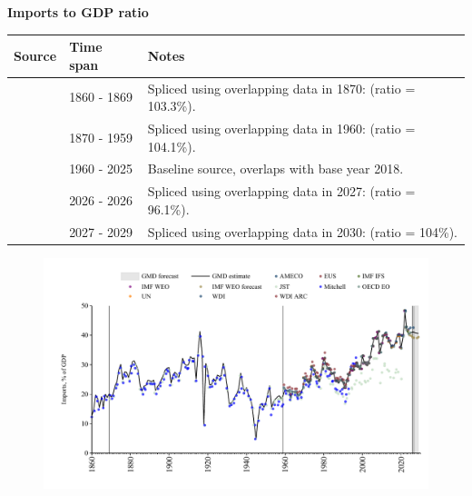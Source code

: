 \documentclass[12pt,a4paper,landscape]{article}
\begin{document}
\begin{adjustbox}{max totalsize={\paperwidth}{\paperheight},center}
\begin{minipage}[t][\textheight][t]{\textwidth}
\vspace*{0.5cm}
{}
\begin{center}
{\Large\bfseries Imports to GDP ratio}
\end{center}
\vspace{0.5cm}
\begin{table}[H]
\centering
\small
\begin{tabular}{|l|l|l|}
\hline
\textbf{Source} & \textbf{Time span} & \textbf{Notes} \\
\hline
\rowcolor{white}\cite{Mitchell}& 1860 - 1869 &Spliced using overlapping data in 1870: (ratio = 103.3\%). \\
\rowcolor{lightgray}\cite{JST}& 1870 - 1959 &Spliced using overlapping data in 1960: (ratio = 104.1\%). \\
\rowcolor{white}\cite{OECD_EO}& 1960 - 2025 &Baseline source, overlaps with base year 2018. \\
\rowcolor{lightgray}\cite{AMECO}& 2026 - 2026 &Spliced using overlapping data in 2027: (ratio = 96.1\%). \\
\rowcolor{white}\cite{IMF_WEO_forecast}& 2027 - 2029 &Spliced using overlapping data in 2030: (ratio = 104\%). \\
\hline
\end{tabular}
\end{table}
\begin{figure}[H]
\centering
\includegraphics[width=\textwidth,height=0.6\textheight,keepaspectratio]{graphs/FIN_imports_GDP.pdf}
\end{figure}
\end{minipage}
\end{adjustbox}
\end{document}
